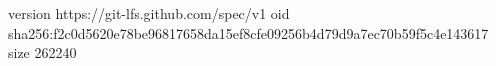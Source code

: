 version https://git-lfs.github.com/spec/v1
oid sha256:f2c0d5620e78be96817658da15ef8cfe09256b4d79d9a7ec70b59f5c4e143617
size 262240
